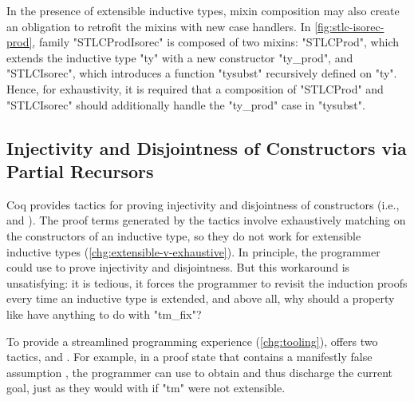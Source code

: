 In the presence of extensible inductive types, mixin composition may
also create an obligation to retrofit the mixins with new case handlers.
In \cref{fig:stlc-isorec-prod}, family "STLCProdIsorec" is composed
of two mixins: "STLCProd", which extends the inductive type "ty" with a
new constructor "ty_prod", and "STLCIsorec", which introduces a
function "tysubst" recursively defined on "ty".
Hence, for exhaustivity, it is required that a composition of
"STLCProd" and "STLCIsorec" should additionally handle the "ty_prod"
case in "tysubst".

%
%
%
%
%
%


\subsection{Injectivity and Disjointness of Constructors via Partial Recursors}
\label{sec:prec}


Coq provides tactics for proving injectivity and disjointness of constructors
(i.e.,  and ).
The proof terms generated by the tactics involve exhaustively
matching on the constructors of an inductive type, so
they do not work for extensible inductive types (\ref{chg:extensible-v-exhaustive}).
%
In principle, the programmer could use  to prove
injectivity and disjointness.
But this workaround is unsatisfying:
it is tedious, it forces the programmer to revisit
the induction proofs every time an inductive type is extended,
and above all, why should a property like
 have anything to do with "tm_fix"?

To provide a streamlined programming experience (\ref{chg:tooling}),
\Lang offers two tactics,  and .
For example, in a proof state that contains a manifestly false assumption
, the programmer can use
 to obtain  and thus discharge
the current goal, just as they would with  if "tm"
were not extensible.


